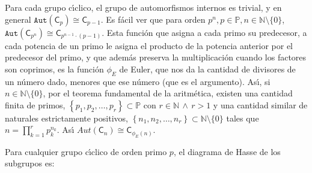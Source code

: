 \documentclass[final,12pt,a4paper,twoside,fleqn]{extbook}
\newcommand{\set}[1]{\ensuremath{\left\lbrace{#1}\right\rbrace}}
\newcommand{\setP}{\ensuremath{}\mathbb{P}}
\newcommand{\grclass}[1]{\ensuremath{\mathsf{#1}}}
\newcommand{\cyclicgr}[1]{\ensuremath{{\grclass{C}}_{#1}}}
\newcommand{\trivialgr}{\ensuremath{{\grclass{C}}_{\mathbf{1}}}}
\theoremstyle{definition}
\theoremstyle{remark}
\begin{document}
Para cada grupo c{\'{\i}}clico, el grupo de automorfismos internos es trivial,
y en general $\mathtt{Aut}(\cyclicgr{p})             \cong             \cyclicgr{p-1}$. Es f\'acil ver que
para orden $p^n , p             \in \mathds{P} , n              \in \mathds{N}\setminus\{0\}$,
$\mathtt{Aut}(\cyclicgr{p^n})             \cong             \cyclicgr{p^{n-1}             \cdot (p-1)}$.
Esta funci\'on que asigna a cada primo su predecesor, a cada potencia de un primo
le asigna el producto de la potencia anterior por el predecesor del primo, y que
adem\'as preserva la multiplicaci\'on cuando los factores son coprimos, es la funci\'on
$\phi_{E}$ de Euler, que nos da la cantidad de divisores de un n\'umero dado,
menores que ese n\'umero (que es el argumento). As{\'{\i}}, si
$n             \in \mathds{N}\setminus\{0\}$, por el teorema fundamental de la aritm\'etica,
existen una cantidad finita de primos,
$\left\lbrace p_1 , p_2 , \ldots , p_r \right\rbrace             \subset \mathds{P}$ con
$r             \in \mathds{N}\,            \wedge             \, r>1$ y una cantidad similar de naturales
estrictamente positivos, $\left\lbrace n_1, n_2 , \ldots , n_r \right\rbrace
            \subset \mathds{N}\setminus\{0\}$ tales que $n = {\prod}_{k=1}^{r} p_k^{n_k}$.
As{\'{\i}} $Aut(\cyclicgr{n})             \cong             \cyclicgr{{\phi_E}(n)}$.

Para cualquier grupo c{\'{\i}}clico de orden primo $p$, el diagrama de Hasse de
los subgrupos es:

\begin{center}
\end{center}


\begin{center}
\end{center}
\end{document}
